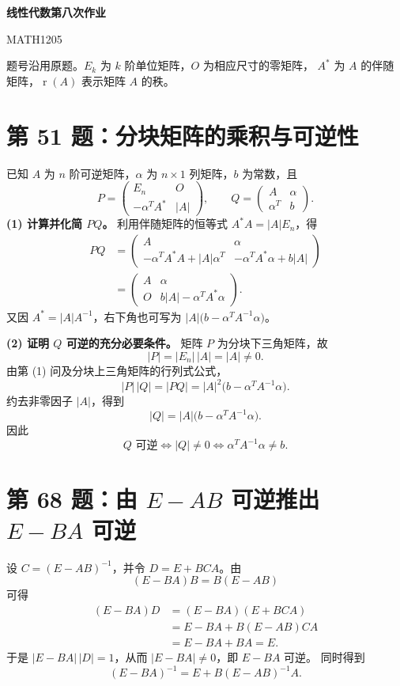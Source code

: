\documentclass[11pt,a4paper,fontset=fandol]{ctexart}
\newcommand{\rk}{\operatorname{r}}
\newcommand{\ans}[1]{\boxed{#1}}
\newcommand{\problem}[1]{\Needspace{9\baselineskip}\section*{#1}}
\begin{document}
\setlength{\abovedisplayskip}{7pt plus 2pt minus 2pt}
\setlength{\belowdisplayskip}{7pt plus 2pt minus 2pt}
\setlength{\abovedisplayshortskip}{4pt plus 1pt minus 1pt}
\setlength{\belowdisplayshortskip}{4pt plus 1pt minus 1pt}
\begin{center}
{\LARGE\bfseries 线性代数第八次作业}\par
\vspace{0.3em}
{\small MATH1205}
\end{center}
\vspace{-0.4em}
题号沿用原题。$E_k$ 为 $k$ 阶单位矩阵，$O$ 为相应尺寸的零矩阵，
$A^*$ 为 $A$ 的伴随矩阵，$\rk(A)$ 表示矩阵 $A$ 的秩。

\problem{第 51 题：分块矩阵的乘积与可逆性}
已知 $A$ 为 $n$ 阶可逆矩阵，$\alpha$ 为 $n\times1$ 列矩阵，$b$ 为常数，且
\[
P=\begin{pmatrix}E_n&O\\-\alpha^T A^*&|A|\end{pmatrix},
\qquad
Q=\begin{pmatrix}A&\alpha\\\alpha^T&b\end{pmatrix}.
\]
\textbf{(1) 计算并化简 $PQ$。}
利用伴随矩阵的恒等式 $A^*A=|A|E_n$，得
\[
\begin{aligned}
PQ
&=\begin{pmatrix}
A&\alpha\\
-\alpha^T A^*A+|A|\alpha^T&-\alpha^T A^*\alpha+b|A|
\end{pmatrix}\\[2pt]
&=\ans{\begin{pmatrix}
A&\alpha\\
O&b|A|-\alpha^T A^*\alpha
\end{pmatrix}}.
\end{aligned}
\]
又因 $A^*=|A|A^{-1}$，右下角也可写为
$|A|\bigl(b-\alpha^T A^{-1}\alpha\bigr)$。

\textbf{(2) 证明 $Q$ 可逆的充分必要条件。}
矩阵 $P$ 为分块下三角矩阵，故
\[
|P|=|E_n|\,|A|=|A|\ne0.
\]
由第 (1) 问及分块上三角矩阵的行列式公式，
\[
|P|\,|Q|=|PQ|
=|A|^2\bigl(b-\alpha^T A^{-1}\alpha\bigr).
\]
约去非零因子 $|A|$，得到
\[
|Q|=|A|\bigl(b-\alpha^T A^{-1}\alpha\bigr).
\]
因此
\[
\ans{Q\text{ 可逆}\iff |Q|\ne0
\iff \alpha^T A^{-1}\alpha\ne b}.
\]

\problem{第 68 题：由 $E-AB$ 可逆推出 $E-BA$ 可逆}
设 $C=(E-AB)^{-1}$，并令 $D=E+BCA$。由
\[
(E-BA)B=B(E-AB)
\]
可得
\[
\begin{aligned}
(E-BA)D
&=(E-BA)(E+BCA)\\
&=E-BA+B(E-AB)CA\\
&=E-BA+BA=E.
\end{aligned}
\]
于是 $|E-BA|\,|D|=1$，从而 $|E-BA|\ne0$，即 $E-BA$ 可逆。
同时得到
\[
\ans{(E-BA)^{-1}=E+B(E-AB)^{-1}A}.
\]
\end{document}
